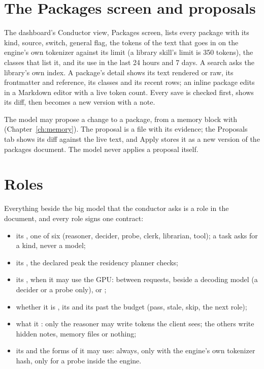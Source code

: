 \section{The Packages screen and proposals}

The dashboard's Conductor view, Packages screen, lists every package with its kind, source, switch, general flag, the tokens of the text that goes in on the engine's own tokenizer against its limit (a library skill's limit is 350 tokens), the classes that list it, and its use in the last 24 hours and 7 days. A search asks the library's own index. A package's detail shows its text rendered or raw, its frontmatter and reference, its classes and its recent rows; an inline package edits in a Markdown editor with a live token count. Every save is checked first, shows its diff, then becomes a new version with a note.

The model may propose a change to a package, from a memory block with  (Chapter~\ref{ch:memory}). The proposal is a file with its evidence; the Proposals tab shows its diff against the live text, and Apply stores it as a new version of the packages document. The model never applies a proposal itself.

\section{Roles}\label{sec:roles}

Everything beside the big model that the conductor asks is a role in the  document, and every role signs one contract:

\begin{itemize}
\item its , one of six (reasoner, decider, probe, clerk, librarian, tool); a task asks for a kind, never a model;
\item its , the declared peak the residency planner checks;
\item its , when it may use the GPU:  between requests,  beside a decoding model (a decider or a probe only), or ;
\item whether it is , its  and its  past the budget (pass, stale, skip, the next role);
\item what it : only the reasoner may write tokens the client sees; the others write hidden notes, memory files or nothing;
\item its  and the forms of  it may use:  always,  only with the engine's own tokenizer hash,  only for a probe inside the engine.
\end{itemize}

